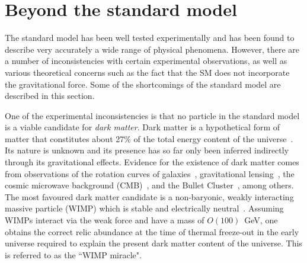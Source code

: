 \section{Beyond the standard model}
\label{sec:theory-bsm}
The standard model has been well tested experimentally and has been found to 
describe very accurately a wide range of physical phenomena. However, there are 
a number of inconsistencies with certain experimental observations, as well as 
various theoretical concerns such as the fact that the SM does not incorporate 
the gravitational force. Some of the shortcomings of the standard model are 
described in this section.


One of the experimental inconsistencies is that no particle in the standard 
model is a viable candidate for \textit{dark matter}. %
Dark matter is a 
hypothetical form of matter that constitutes about 27\% of the total energy 
content of the universe~\cite{planck15}. Its nature is unknown and its presence 
has so far only been inferred indirectly through its gravitational effects. 
Evidence for the existence of dark matter comes from observations of the 
rotation curves of galaxies~\cite{zwicky37}, gravitational 
lensing~\cite{lensing90}, the cosmic microwave background 
(CMB)~\cite{planck15,wmap9}, and the Bullet Cluster~\cite{bullet06}, among 
others. 
The most favoured dark matter candidate is a non-baryonic, weakly interacting 
massive particle (WIMP) which is stable and electrically neutral~\cite{wimp}.
Assuming WIMPs interact via the weak force and have a mass of $O(100)$~GeV, one 
obtains the correct relic abundance at the time of thermal freeze-out in the 
early universe required to explain the present dark matter content of the 
universe. 
This is referred to as the ``WIMP miracle".

